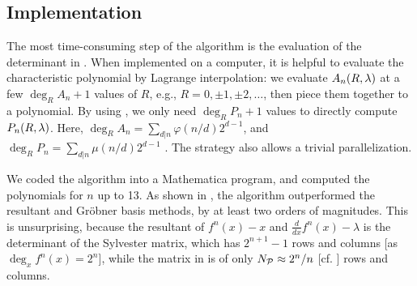 \documentclass{ws-ijbc}
\begin{document}





\subsection{\label{sec:end}Implementation}



The most time-consuming step of the algorithm
is the evaluation of the determinant in .
%
When implemented on a computer,
it is helpful to evaluate the characteristic polynomial
by Lagrange interpolation:
we evaluate $A_n(R, \lambda)$ at a few $\deg_R A_n + 1$ values of $R$,
e.g., $R = 0, \pm1, \pm2,\ldots$, then piece them together
to a polynomial.
%
By using , we only need $\deg_R P_n + 1$ values
  to directly compute $P_n(R, \lambda)$.
%
%
Here,
$\deg_R A_n = \sum_{d|n} \varphi(n/d) 2^{d-1}$,
and $\deg_R P_n = \sum_{d|n} \mu(n/d) 2^{d-1}$
  \cite{mira, stephenson1}.
%
The strategy also allows a trivial parallelization.



We coded the algorithm into a Mathematica program,
and computed the polynomials for $n$ up to 13.
%
As shown in , the algorithm
outperformed the resultant \cite{burm} and
  Gr\"obner basis \cite{kk1} methods,
  by at least two orders of magnitudes.
%
This is unsurprising,
  because the resultant of $f^n(x)-x$ and $\frac{d}{dx}f^n(x)-\lambda$
  is the determinant of the Sylvester matrix, which has
  $2^{n+1}-1$ rows and columns
  [as $\deg_x f^n(x) = 2^n$],
  while the matrix in 
  is of only $N_\mathcal P \approx 2^n/n$ [cf. ] rows and columns.
\end{document}
